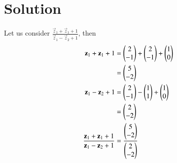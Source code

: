 \documentclass[journal,12pt,twocolumn]{IEEEtran}
\begin{document}
	\section{Solution}
	Let us consider $\frac{\vec{z}_1 + \vec{z}_1 + 1}{\vec{z}_1-\vec{z}_2+1}$, then
	\begin{align}
		\mathbf{z}_1 + \mathbf{z}_1 + 1 &= \begin{pmatrix}2 \\ -1\end{pmatrix} + \begin{pmatrix} 2 \\ -1\end{pmatrix} + \begin{pmatrix} 1 \\ 0\end{pmatrix} \\
		&= \begin{pmatrix}5 \\ -2\end{pmatrix}\\
		\mathbf{z}_1 - \mathbf{z}_2 + 1 &= \begin{pmatrix}2 \\ -1\end{pmatrix} - \begin{pmatrix} 1 \\ 1\end{pmatrix} + \begin{pmatrix} 1 \\ 0\end{pmatrix} \\
		&= \begin{pmatrix}2 \\ -2\end{pmatrix} \\ 
		\frac{\mathbf{z}_1 + \mathbf{z}_1 + 1}{\mathbf{z}_1-\mathbf{z}_2+1} &= \frac{\begin{pmatrix}5 \\ -2\end{pmatrix}}{\begin{pmatrix}2 \\ -2\end{pmatrix}}\label{eq:result} 
	\end{align}
\end{document}
